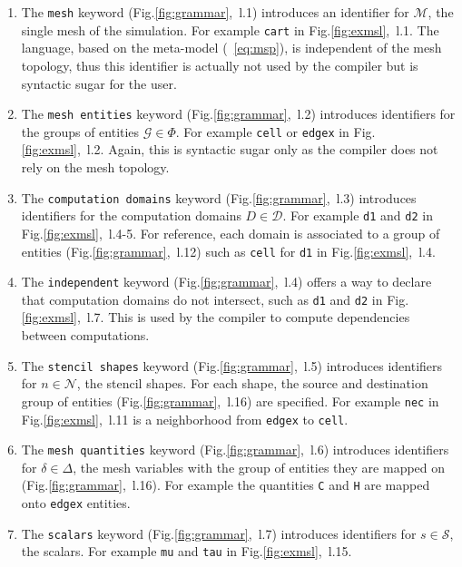 \begin{enumerate}

\item The \texttt{mesh} keyword (Fig.\ref{fig:grammar},~l.1) introduces an identifier for $\mathcal{M}$, the single mesh of the simulation. For example \texttt{cart} in Fig.\ref{fig:exmsl},~l.1. The language, based on the meta-model (~\ref{eq:msp}), is independent of the mesh topology, thus this identifier is actually not used by the compiler but is syntactic sugar for the user.

\item The \texttt{mesh entities} keyword (Fig.\ref{fig:grammar},~l.2) introduces identifiers for the groups of entities $\mathcal{G}\in\Phi$. For example \texttt{cell} or \texttt{edgex} in Fig.\ref{fig:exmsl},~l.2. Again, this is syntactic sugar only as the compiler does not rely on the mesh topology.

\item The \texttt{computation domains} keyword (Fig.\ref{fig:grammar},~l.3) introduces identifiers for the computation domains $D\in\mathcal{D}$. For example \texttt{d1} and \texttt{d2} in Fig.\ref{fig:exmsl},~l.4-5. For reference, each domain is associated to a group of entities (Fig.\ref{fig:grammar},~l.12) such as \texttt{cell} for \texttt{d1} in Fig.\ref{fig:exmsl},~l.4.

\item The \texttt{independent} keyword (Fig.\ref{fig:grammar},~l.4) offers a way to declare that computation domains do not intersect, such as \texttt{d1} and \texttt{d2} in  Fig.\ref{fig:exmsl},~l.7. This is used by the compiler to compute dependencies between computations.

\item The \texttt{stencil shapes} keyword (Fig.\ref{fig:grammar},~l.5) introduces identifiers for $n\in\mathcal{N}$, the stencil shapes. For each shape, the source and destination group of entities (Fig.\ref{fig:grammar},~l.16) are specified. For example \texttt{nec} in Fig.\ref{fig:exmsl},~l.11 is a neighborhood from \texttt{edgex} to \texttt{cell}.

\item The \texttt{mesh quantities} keyword (Fig.\ref{fig:grammar},~l.6) introduces identifiers for $\delta\in\Delta$, the mesh variables with the group of entities they are mapped on (Fig.\ref{fig:grammar},~l.16). For example the quantities \texttt{C} and \texttt{H} are mapped onto \texttt{edgex} entities.

\item The \texttt{scalars} keyword (Fig.\ref{fig:grammar},~l.7) introduces identifiers for $s\in\mathcal{S}$, the scalars. For example \texttt{mu} and \texttt{tau} in Fig.\ref{fig:exmsl},~l.15. 


\end{enumerate}
